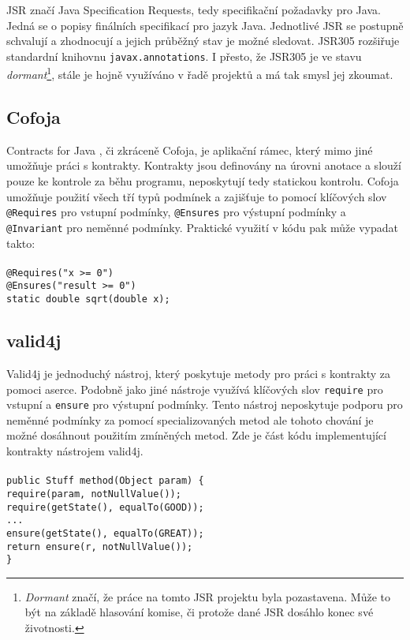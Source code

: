 			JSR značí Java Specification Requests, tedy specifikační požadavky pro Java. Jedná se o popisy finálních specifikací pro jazyk Java. Jednotlivé JSR se postupně schvalují a zhodnocují a jejich průběžný stav je možné sledovat. JSR305 rozšiřuje standardní knihovnu \texttt{javax.annotations}. I přesto, že JSR305 je ve stavu \emph{dormant}\footnote{\emph{Dormant} značí, že práce na tomto JSR projektu byla pozastavena. Může to být na základě hlasování komise, či protože dané JSR dosáhlo konec své životnosti.}, stále je hojně využíváno v řadě projektů a má tak smysl jej zkoumat.
			
	
		\subsection{Cofoja}
			Contracts for Java \cite{cofoja}, či zkráceně Cofoja, je aplikační rámec, který mimo jiné umožňuje práci s kontrakty. Kontrakty jsou definovány na úrovni anotace a slouží pouze ke kontrole za běhu programu, neposkytují tedy statickou kontrolu. Cofoja umožňuje použití všech tří typů podmínek a zajišťuje to pomocí klíčových slov \texttt{@Requires} pro vstupní podmínky, 
\texttt{@Ensures} pro výstupní podmínky a \texttt{@Invariant} pro neměnné podmínky. Praktické využití v kódu pak může vypadat takto:\\\\
				\- \- \- \- \- \texttt{@Requires("x >= 0")}\\
				\- \- \- \- \- \texttt{@Ensures("result >= 0")}\\
				\- \- \- \- \- \texttt{static double sqrt(double x);}\\


		\subsection{valid4j}
			Valid4j \cite{valid4j} je jednoduchý nástroj, který poskytuje metody pro práci s kontrakty za pomoci aserce. Podobně jako jiné nástroje využívá klíčových slov \texttt{require} pro vstupní a \texttt{ensure} pro výstupní podmínky. Tento nástroj neposkytuje podporu pro neměnné podmínky za pomocí specializovaných metod ale tohoto chování je možné dosáhnout použitím zmíněných metod. Zde je část kódu implementující kontrakty nástrojem valid4j.\\\\  
				\- \- \- \- \- \texttt{public Stuff method(Object param) \{}\\
				\- \- \- \- \- \- \- \- \- \- \texttt{require(param, notNullValue());}\\
				\- \- \- \- \- \- \- \- \- \- \texttt{require(getState(), equalTo(GOOD));}\\
				\- \- \- \- \- \- \- \- \- \- \texttt{...}\\
				\- \- \- \- \- \- \- \- \- \- \texttt{ensure(getState(), equalTo(GREAT));}\\
				\- \- \- \- \- \- \- \- \- \- \texttt{return ensure(r, notNullValue());}\\
				\- \- \- \- \- \texttt{\}}\\	
	

